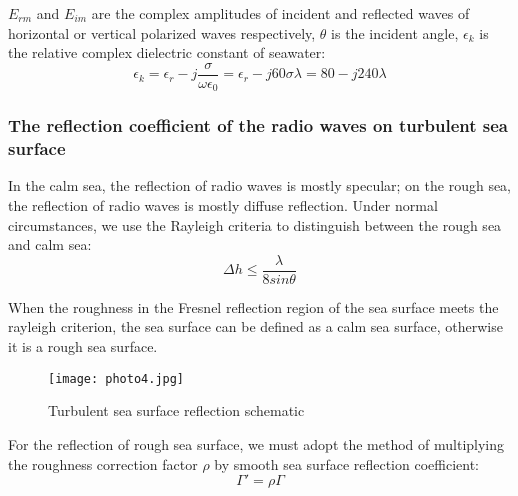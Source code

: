 \documentclass{mcmthesis}
\begin{document}
$E_{rm}$ and $E_{im}$ are the complex amplitudes of incident and reflected waves of horizontal or vertical polarized waves respectively, $\theta$ is the incident angle, $\epsilon_k$ is the relative complex dielectric constant of seawater:
\begin{equation}
\epsilon_k=\epsilon_r-j\frac{\sigma}{\omega\epsilon_0}=\epsilon_r-j60\sigma\lambda=80-j240\lambda
\end{equation}

\subsubsection{ The reflection coefficient of the radio waves on turbulent sea surface\cite{3}}%
In the calm sea, the reflection of radio waves is mostly specular; on the rough sea, the reflection of radio waves is mostly diffuse reflection. Under normal circumstances, we use the Rayleigh criteria\cite{2} to distinguish between the rough sea and calm sea:
\begin{equation}
\Delta{h}\leq\frac{\lambda}{8sin\theta}
\end{equation}

When the roughness in the Fresnel reflection region of the sea surface meets the rayleigh criterion, the sea surface can be defined as a calm sea surface, otherwise it is a rough sea surface.
\begin{figure}[h]
\small
\centering
\texttt{[image: photo4.jpg]}
\caption{Turbulent sea surface reflection schematic} \label{fig:aa}
\end{figure}
For the reflection of rough sea surface, we must adopt the method of multiplying the roughness correction factor $\rho$ by smooth sea surface reflection coefficient:
\begin{equation}
\Gamma'=\rho\Gamma
\end{equation}
\end{document}
